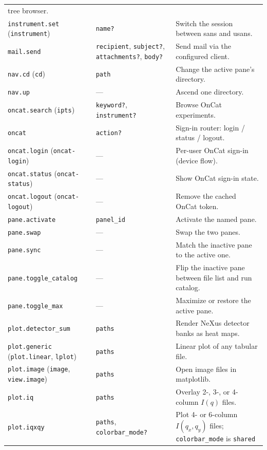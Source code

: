 \documentclass[tm]{ornltm}
\begin{document}
\begin{small}
\begin{longtable}{p{} p{} p{}}
    tree browser. \\
  \texttt{instrument.set} (\texttt{instrument}) & \texttt{name?} & Switch the
    session between \ac{sans} and \ac{usans}. \\
  \texttt{mail.send} & \texttt{recipient}, \texttt{subject?},
    \texttt{attachments?}, \texttt{body?} & Send mail via the configured
    client. \\
  \texttt{nav.cd} (\texttt{cd}) & \texttt{path} & Change the active pane's
    directory. \\
  \texttt{nav.up} & --- & Ascend one directory. \\
  \texttt{oncat.search} (\texttt{ipts}) & \texttt{keyword?},
    \texttt{instrument?} & Browse OnCat experiments. \\
  \texttt{oncat} & \texttt{action?} & Sign-in router: login / status / logout. \\
  \texttt{oncat.login} (\texttt{oncat-login}) & --- & Per-user OnCat sign-in
    (device flow). \\
  \texttt{oncat.status} (\texttt{oncat-status}) & --- & Show OnCat sign-in
    state. \\
  \texttt{oncat.logout} (\texttt{oncat-logout}) & --- & Remove the cached OnCat
    token. \\
  \texttt{pane.activate} & \texttt{panel\_id} & Activate the named pane. \\
  \texttt{pane.swap} & --- & Swap the two panes. \\
  \texttt{pane.sync} & --- & Match the inactive pane to the active one. \\
  \texttt{pane.toggle\_catalog} & --- & Flip the inactive pane between file list
    and run catalog. \\
  \texttt{pane.toggle\_max} & --- & Maximize or restore the active pane. \\
  \texttt{plot.detector\_sum} & \texttt{paths} & Render NeXus detector banks as
    heat maps. \\
  \texttt{plot.generic} (\texttt{plot.linear}, \texttt{lplot}) &
    \texttt{paths} & Linear plot of any tabular file. \\
  \texttt{plot.image} (\texttt{image}, \texttt{view.image}) & \texttt{paths} &
    Open image files in matplotlib. \\
  \texttt{plot.iq} & \texttt{paths} & Overlay 2-, 3-, or 4-column $I(q)$
    files. \\
  \texttt{plot.iqxqy} & \texttt{paths}, \texttt{colorbar\_mode?} & Plot 4-
    or 6-column $I(q_x,q_y)$ files; \texttt{colorbar\_mode} is \texttt{shared}

\end{longtable}
\end{small}
\end{document}
